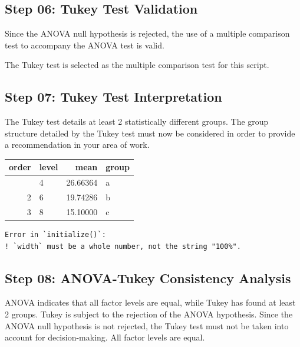 \documentclass[
  letterpaper,
  DIV=11,
  numbers=noendperiod]{scrartcl}
\begin{document}
\subsection{\texorpdfstring{\textbf{Step 06:} Tukey Test
Validation}{Step 06: Tukey Test Validation}}\label{step-06-tukey-test-validation}

Since the ANOVA null hypothesis is rejected, the use of a multiple
comparison test to accompany the ANOVA test is valid.

The Tukey test is selected as the multiple comparison test for this
script.

\newpage

\subsection{\texorpdfstring{\textbf{Step 07:} Tukey Test
Interpretation}{Step 07: Tukey Test Interpretation}}\label{step-07-tukey-test-interpretation}

The Tukey test details at least 2 statistically different groups. The
group structure detailed by the Tukey test must now be considered in
order to provide a recommendation in your area of work.

\begin{longtable}[]{@{}rlrl@{}}
\toprule\noalign{}
order & level & mean & group \\
\midrule\noalign{}
\endhead
\bottomrule\noalign{}
\endlastfoot
1 & 4 & 26.66364 & a \\
2 & 6 & 19.74286 & b \\
3 & 8 & 15.10000 & c \\
\end{longtable}

\begin{verbatim}
Error in `initialize()`:
! `width` must be a whole number, not the string "100%".
\end{verbatim}

\newpage

\subsection{\texorpdfstring{\textbf{Step 08:} ANOVA-Tukey Consistency
Analysis}{Step 08: ANOVA-Tukey Consistency Analysis}}\label{step-08-anova-tukey-consistency-analysis}

ANOVA indicates that all factor levels are equal, while Tukey has found
at least 2 groups. Tukey is subject to the rejection of the ANOVA
hypothesis. Since the ANOVA null hypothesis is not rejected, the Tukey
test must not be taken into account for decision-making. All factor
levels are equal.
\end{document}
